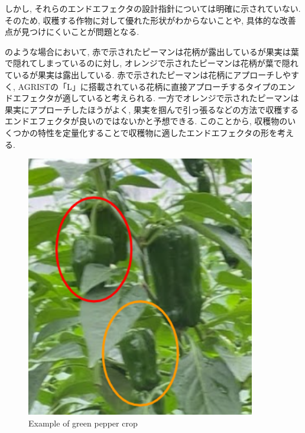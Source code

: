 しかし, それらのエンドエフェクタの設計指針については明確に示されていない.
そのため, 収穫する作物に対して優れた形状がわからないことや, 具体的な改善点が見つけにくいことが問題となる.

\vspace{5mm}

のような場合において, 赤で示されたピーマンは花柄が露出しているが果実は葉で隠れてしまっているのに対し, オレンジで示されたピーマンは花柄が葉で隠れているが果実は露出している.
赤で示されたピーマンは花柄にアプローチしやすく, AGRISTの「L」に搭載されている花柄に直接アプローチするタイプのエンドエフェクタが適していると考えられる.
一方でオレンジで示されたピーマンは果実にアプローチしたほうがよく, 果実を掴んで引っ張るなどの方法で収穫するエンドエフェクタが良いのではないかと予想できる.
このことから, 収穫物のいくつかの特性を定量化することで収穫物に適したエンドエフェクタの形を考える.

\vspace{5mm}
\begin{figure}[H]
     \centering
     \includegraphics[width=100mm]{images/png/plantex.png}
     \caption{Example of green pepper crop}
     \label{Fig:plantex}
\end{figure}

\newpage
